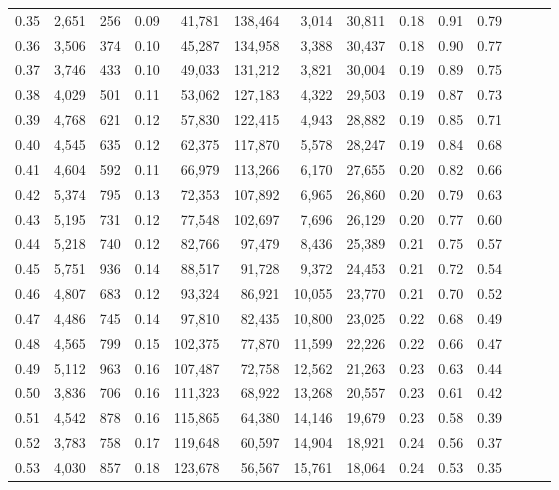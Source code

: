 \begin{tabular}{rrrrrrrrrrrrrr}
0.35 &  2,651 &    256 &  0.09 &   41,781 &  138,464 &   3,014 &  30,811 &  0.18 &  0.91 &      0.79 \\
0.36 &  3,506 &    374 &  0.10 &   45,287 &  134,958 &   3,388 &  30,437 &  0.18 &  0.90 &      0.77 \\
0.37 &  3,746 &    433 &  0.10 &   49,033 &  131,212 &   3,821 &  30,004 &  0.19 &  0.89 &      0.75 \\
0.38 &  4,029 &    501 &  0.11 &   53,062 &  127,183 &   4,322 &  29,503 &  0.19 &  0.87 &      0.73 \\
0.39 &  4,768 &    621 &  0.12 &   57,830 &  122,415 &   4,943 &  28,882 &  0.19 &  0.85 &      0.71 \\
0.40 &  4,545 &    635 &  0.12 &   62,375 &  117,870 &   5,578 &  28,247 &  0.19 &  0.84 &      0.68 \\
0.41 &  4,604 &    592 &  0.11 &   66,979 &  113,266 &   6,170 &  27,655 &  0.20 &  0.82 &      0.66 \\
0.42 &  5,374 &    795 &  0.13 &   72,353 &  107,892 &   6,965 &  26,860 &  0.20 &  0.79 &      0.63 \\
0.43 &  5,195 &    731 &  0.12 &   77,548 &  102,697 &   7,696 &  26,129 &  0.20 &  0.77 &      0.60 \\
0.44 &  5,218 &    740 &  0.12 &   82,766 &   97,479 &   8,436 &  25,389 &  0.21 &  0.75 &      0.57 \\
0.45 &  5,751 &    936 &  0.14 &   88,517 &   91,728 &   9,372 &  24,453 &  0.21 &  0.72 &      0.54 \\
0.46 &  4,807 &    683 &  0.12 &   93,324 &   86,921 &  10,055 &  23,770 &  0.21 &  0.70 &      0.52 \\
0.47 &  4,486 &    745 &  0.14 &   97,810 &   82,435 &  10,800 &  23,025 &  0.22 &  0.68 &      0.49 \\
0.48 &  4,565 &    799 &  0.15 &  102,375 &   77,870 &  11,599 &  22,226 &  0.22 &  0.66 &      0.47 \\
0.49 &  5,112 &    963 &  0.16 &  107,487 &   72,758 &  12,562 &  21,263 &  0.23 &  0.63 &      0.44 \\
0.50 &  3,836 &    706 &  0.16 &  111,323 &   68,922 &  13,268 &  20,557 &  0.23 &  0.61 &      0.42 \\
0.51 &  4,542 &    878 &  0.16 &  115,865 &   64,380 &  14,146 &  19,679 &  0.23 &  0.58 &      0.39 \\
0.52 &  3,783 &    758 &  0.17 &  119,648 &   60,597 &  14,904 &  18,921 &  0.24 &  0.56 &      0.37 \\
0.53 &  4,030 &    857 &  0.18 &  123,678 &   56,567 &  15,761 &  18,064 &  0.24 &  0.53 &      0.35 \\

\end{tabular}
